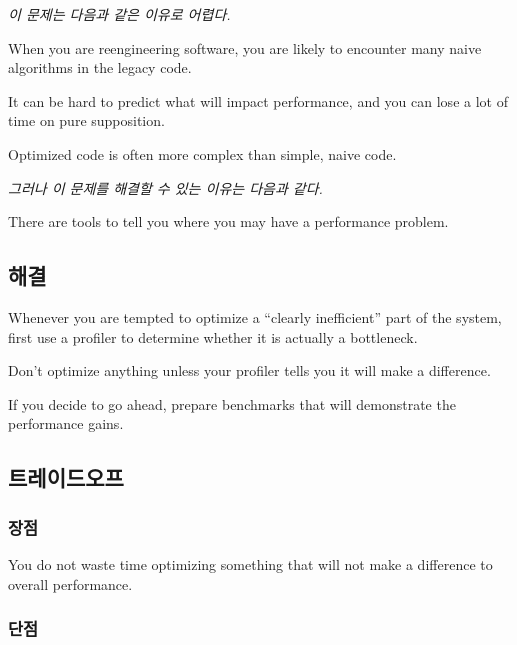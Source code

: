 \documentclass[a4paper,10pt,twoside]{book}
\begin{document}
\emph{이 문제는 다음과 같은 이유로 어렵다.}

\begin{bulletlist}
\item When you are reengineering software, you are likely to encounter many naive algorithms in the legacy code.

\item It can be hard to predict what will impact performance, and you can lose a lot of time on pure supposition.

\item Optimized code is often more complex than simple, naive code.
\end{bulletlist}

\emph{그러나 이 문제를 해결할 수 있는 이유는 다음과 같다.}

\begin{bulletlist}
\item There are tools to tell you where you may have a performance problem.
\end{bulletlist}

\subsection*{해결}

Whenever you are tempted to optimize a ``clearly inefficient'' part of the system, first use a profiler to determine whether it is actually a bottleneck. 

Don't optimize anything unless your profiler tells you it will make a difference.

If you decide to go ahead, prepare benchmarks that will demonstrate the performance gains. 

\subsection*{트레이드오프}

\subsubsection*{장점}

\begin{bulletlist}
\item You do not waste time optimizing something that will not make a difference to overall performance.
\end{bulletlist}

\subsubsection*{단점}
\end{document}
